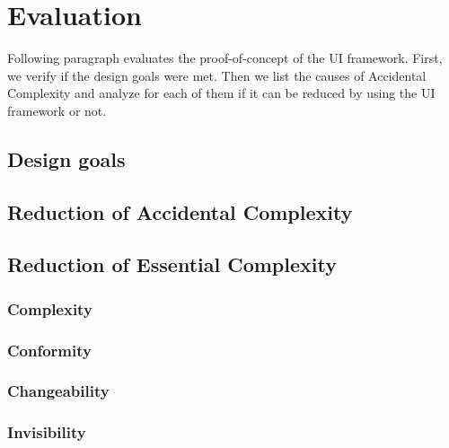 \section{Evaluation}\label{evaluation}

Following paragraph evaluates the proof-of-concept of the UI framework. First, we verify if the design goals were met. Then we list the causes of Accidental Complexity and analyze for each of them if it can be reduced by using the UI framework or not.

\subsection{Design goals}\label{designgoals}
\subsection{Reduction of Accidental Complexity}\label{accidentalcomplexity}
\subsection{Reduction of Essential Complexity}\label{essentialcomplexity}
\subsubsection{Complexity}\label{complexity}
\subsubsection{Conformity}\label{conformity}
\subsubsection{Changeability}\label{changeability}
\subsubsection{Invisibility}\label{invisibility}
